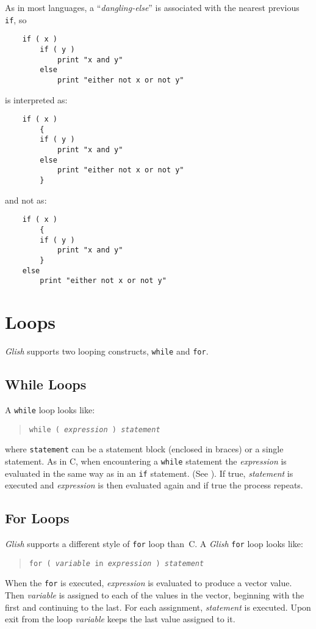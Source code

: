 As in most languages, a ``{\em dangling-else}'' is associated with the nearest
previous {\tt if}, so
\begin{verbatim}
    if ( x )
        if ( y )
            print "x and y"
        else
            print "either not x or not y"
\end{verbatim}
is interpreted as:
\begin{verbatim}
    if ( x )
        {
        if ( y )
            print "x and y"
        else
            print "either not x or not y"
        }
\end{verbatim}
and not as:
\begin{verbatim}
    if ( x )
        {
        if ( y )
            print "x and y"
        }
    else
        print "either not x or not y"
\end{verbatim}

\section{Loops}

{\em Glish} supports two looping constructs, {\tt while} and {\tt for}.

\subsection{While Loops}

A {\tt while} loop looks like:
\begin{quote}
    {\tt while ( {\em expression} ) {\em statement}}
\end{quote}
where {\tt statement} can be a statement block (enclosed in braces) or a
single statement. As in C, when encountering a {\tt while} statement the
{\em expression} is evaluated in the same way as in an {\tt if} statement.
(See ).  If true, {\em statement} is executed and
{\em expression} is then evaluated again and if true the process repeats.

\subsection{For Loops}
\label{for-loops}

{\em Glish} supports a different style of {\tt for} loop than~C.
A {\em Glish} {\tt for} loop looks like:
\begin{quote}
    {\tt for ( {\em variable} in {\em expression} ) {\em statement}}
\end{quote}
When the {\tt for} is executed, {\em expression} is evaluated to produce
a vector value.  Then {\em variable} is assigned to each of the values in
the vector, beginning with the first and continuing to the last.
For each assignment, {\em statement} is executed.  Upon exit from the
loop {\em variable} keeps the last value assigned to it.

